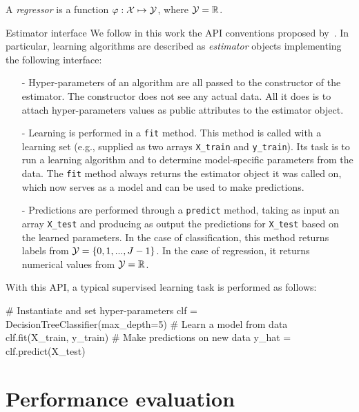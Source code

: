 \begin{definition}
A \emph{regressor} is a function $\varphi: {\cal X} \mapsto {\cal Y}$, where ${\cal Y}=\mathbb{R}$.
\end{definition}

\begin{remark}{Estimator interface}
We follow in this work the API conventions proposed by~\citet{buitinck:2013}.
In particular, learning algorithms are described as \textit{estimator} objects implementing the
following interface:

\begin{itemize}
\item[-] Hyper-parameters of an algorithm are all passed to the constructor of the
estimator. The constructor does not see any actual data. All it does
is to attach hyper-parameters values as public attributes to the estimator object.
\item[-] Learning is performed in a \texttt{fit} method. This method is called with
a learning set (e.g., supplied as two arrays \texttt{X\_train} and \texttt{y\_train}). Its
task is to run a learning algorithm and to determine model-specific parameters
from the data. The \texttt{fit} method always returns the estimator object
it was called on, which now serves as a model and can be used to make predictions.
\item[-] Predictions are performed through a \texttt{predict} method, taking
as input an array \texttt{X\_test} and producing as output the predictions for
\texttt{X\_test} based on the learned parameters. In the case of classification,
this method returns labels from ${\cal Y} = \{0, 1, ..., J-1\}$. In the case of regression,
it returns numerical values from ${\cal Y} = \mathbb{R}$.
\end{itemize}

With this API, a typical supervised learning task is performed as follows:

\vskip0.3cm
\begin{pythoncode}
# Instantiate and set hyper-parameters
clf = DecisionTreeClassifier(max_depth=5)
# Learn a model from data
clf.fit(X_train, y_train)
# Make predictions on new data
y_hat = clf.predict(X_test)
\end{pythoncode}
\end{remark}


\section{Performance evaluation}
\label{sec:2:performance-evaluation}

